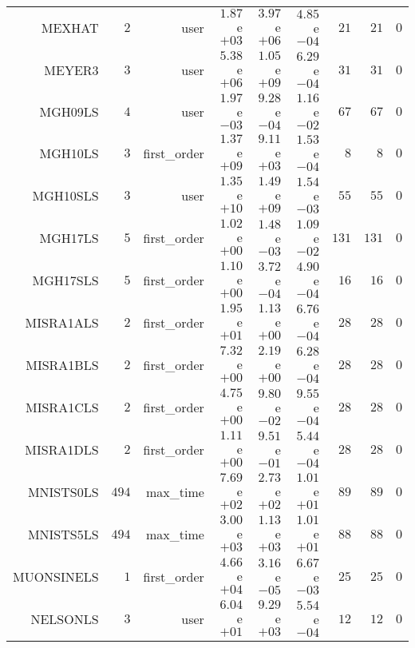 \begin{longtable}{rrrrrrrrr}
MEXHAT & \(     2\) & user & \( 1.87\)e\(+03\) & \( 3.97\)e\(+06\) & \( 4.85\)e\(-04\) & \(    21\) & \(    21\) & \(     0\) \\
MEYER3 & \(     3\) & user & \( 5.38\)e\(+06\) & \( 1.05\)e\(+09\) & \( 6.29\)e\(-04\) & \(    31\) & \(    31\) & \(     0\) \\
MGH09LS & \(     4\) & user & \( 1.97\)e\(-03\) & \( 9.28\)e\(-04\) & \( 1.16\)e\(-02\) & \(    67\) & \(    67\) & \(     0\) \\
MGH10LS & \(     3\) & first\_order & \( 1.37\)e\(+09\) & \( 9.11\)e\(+03\) & \( 1.53\)e\(-04\) & \(     8\) & \(     8\) & \(     0\) \\
MGH10SLS & \(     3\) & user & \( 1.35\)e\(+10\) & \( 1.49\)e\(+09\) & \( 1.54\)e\(-03\) & \(    55\) & \(    55\) & \(     0\) \\
MGH17LS & \(     5\) & first\_order & \( 1.02\)e\(+00\) & \( 1.48\)e\(-03\) & \( 1.09\)e\(-02\) & \(   131\) & \(   131\) & \(     0\) \\
MGH17SLS & \(     5\) & first\_order & \( 1.10\)e\(+00\) & \( 3.72\)e\(-04\) & \( 4.90\)e\(-04\) & \(    16\) & \(    16\) & \(     0\) \\
MISRA1ALS & \(     2\) & first\_order & \( 1.95\)e\(+01\) & \( 1.13\)e\(+00\) & \( 6.76\)e\(-04\) & \(    28\) & \(    28\) & \(     0\) \\
MISRA1BLS & \(     2\) & first\_order & \( 7.32\)e\(+00\) & \( 2.19\)e\(+00\) & \( 6.28\)e\(-04\) & \(    28\) & \(    28\) & \(     0\) \\
MISRA1CLS & \(     2\) & first\_order & \( 4.75\)e\(+00\) & \( 9.80\)e\(-02\) & \( 9.55\)e\(-04\) & \(    28\) & \(    28\) & \(     0\) \\
MISRA1DLS & \(     2\) & first\_order & \( 1.11\)e\(+00\) & \( 9.51\)e\(-01\) & \( 5.44\)e\(-04\) & \(    28\) & \(    28\) & \(     0\) \\
MNISTS0LS & \(   494\) & max\_time & \( 7.69\)e\(+02\) & \( 2.73\)e\(+02\) & \( 1.01\)e\(+01\) & \(    89\) & \(    89\) & \(     0\) \\
MNISTS5LS & \(   494\) & max\_time & \( 3.00\)e\(+03\) & \( 1.13\)e\(+03\) & \( 1.01\)e\(+01\) & \(    88\) & \(    88\) & \(     0\) \\
MUONSINELS & \(     1\) & first\_order & \( 4.66\)e\(+04\) & \( 3.16\)e\(-05\) & \( 6.67\)e\(-03\) & \(    25\) & \(    25\) & \(     0\) \\
NELSONLS & \(     3\) & user & \( 6.04\)e\(+01\) & \( 9.29\)e\(+03\) & \( 5.54\)e\(-04\) & \(    12\) & \(    12\) & \(     0\) \\

\end{longtable}

